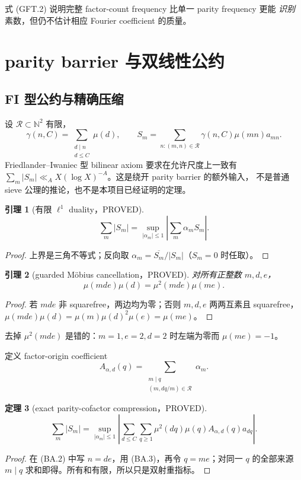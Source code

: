\documentclass[11pt,a4paper]{ctexart}
\newtheorem{theorem}{定理}[section]
\newtheorem{lemma}[theorem]{引理}
\theoremstyle{definition}
\newcommand{\1}{\mathbf 1}
\newcommand{\PROVED}{\textcolor{green!40!black}{\textsf{PROVED}}}
\begin{document}
式 (GFT.2) 说明完整 factor-count frequency 比单一 parity frequency 更能
\emph{识别}素数，但仍不估计相应 Fourier coefficient 的质量。

\section{parity barrier 与双线性公约}
\label{sec:bilinear}

\subsection{FI 型公约与精确压缩}

设 $\mathcal R\subset\mathbb N^2$ 有限，
\[
 \gamma(n,C)=\sum_{\substack{d\mid n\\d\le C}}\mu(d),\qquad
 S_m=\sum_{n:(m,n)\in\mathcal R}\gamma(n,C)\mu(mn)a_{mn}.\tag{BA.1}
\]
Friedlander--Iwaniec 型 bilinear axiom 要求在允许尺度上一致有
$\sum_m|S_m|\ll_A X(\log X)^{-A}$。这是绕开 parity barrier 的额外输入，
不是普通 sieve 公理的推论，也不是本项目已经证明的定理。

\begin{lemma}[有限 $\ell^1$ duality，\PROVED]
\[
 \sum_m|S_m|=\sup_{|\alpha_m|\le1}\left|\sum_m\alpha_mS_m\right|.\tag{BA.2}
\]
\end{lemma}
\begin{proof}
上界是三角不等式；反向取 $\alpha_m=\overline{S_m}/|S_m|$（$S_m=0$ 时任取）。
\end{proof}

\begin{lemma}[guarded Möbius cancellation，\PROVED]
对所有正整数 $m,d,e$，
\[
 \boxed{\mu(mde)\mu(d)=\mu^2(mde)\mu(me).}           \tag{BA.3}
\]
\end{lemma}
\begin{proof}
若 $mde$ 非 squarefree，两边均为零；否则 $m,d,e$ 两两互素且 squarefree，
$\mu(mde)\mu(d)=\mu(m)\mu(d)^2\mu(e)=\mu(me)$。
\end{proof}

去掉 $\mu^2(mde)$ 是错的：$m=1,e=2,d=2$ 时左端为零而 $\mu(me)=-1$。

定义 factor-origin coefficient
\[
 A_{\alpha,d}(q)=\sum_{\substack{m\mid q\\(m,dq/m)\in\mathcal R}}\alpha_m.
                                                               \tag{BA.4}
\]

\begin{theorem}[exact parity-cofactor compression，\PROVED]
\[
 \boxed{\sum_m|S_m|=
 \sup_{|\alpha_m|\le1}\left|
 \sum_{d\le C}\sum_{q\ge1}\mu^2(dq)\mu(q)
 A_{\alpha,d}(q)a_{dq}\right|.}                     \tag{BA.5}
\]
\end{theorem}
\begin{proof}
在 (BA.2) 中写 $n=de$，用 (BA.3)，再令 $q=me$；对同一 $q$ 的全部来源
$m\mid q$ 求和即得。所有和有限，所以只是双射重指标。
\end{proof}
\end{document}
